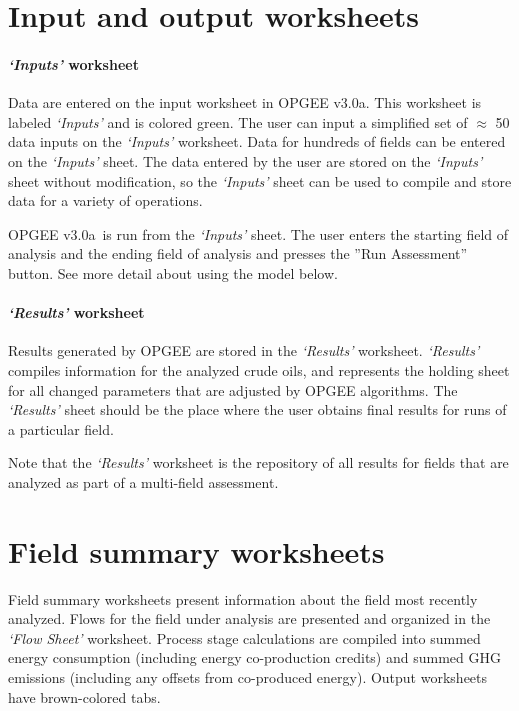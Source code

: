 \documentclass[11pt]{report}
\newcommand{\version}{v3.0a}
\newcommand{\sheet}[1]{\textit{`{#1}'}}
\begin{document}
\clearpage

\section{Input and output worksheets}

\paragraph{\sheet{Inputs} worksheet}

Data are entered on the input worksheet in OPGEE \version. This worksheet is labeled \sheet{Inputs} and is colored green.  The user  can input a simplified set of $\approx$ 50 data inputs on the \sheet{Inputs} worksheet. Data for hundreds of fields can be entered on the \sheet{Inputs} sheet. The data entered by the user are stored on the \sheet{Inputs} sheet without modification, so the \sheet{Inputs} sheet can be used to compile and store data for a variety of operations.

OPGEE \version\, is run from the \sheet{Inputs} sheet.  The user enters the starting field of analysis and the ending field of analysis and presses the ''Run Assessment'' button.  See more detail about using the model below.

\paragraph{\sheet{Results} worksheet}
Results generated by OPGEE are stored in the \sheet{Results} worksheet. \sheet{Results} compiles information for the analyzed crude oils, and represents the holding sheet for all changed parameters that are adjusted by OPGEE algorithms.  The \sheet{Results} sheet should be the place where the user obtains final results for runs of a particular field.

Note that the \sheet{Results} worksheet is the repository of all results for fields that are analyzed as part of a multi-field assessment.  


\clearpage

\section{Field summary worksheets}

Field summary worksheets present information about the field most recently analyzed. Flows for the field under analysis are presented and organized in the \sheet{Flow Sheet} worksheet. Process stage calculations are compiled into summed energy consumption (including energy co-production credits) and summed GHG emissions (including any offsets from co-produced energy).  Output worksheets have brown-colored tabs.
\end{document}
